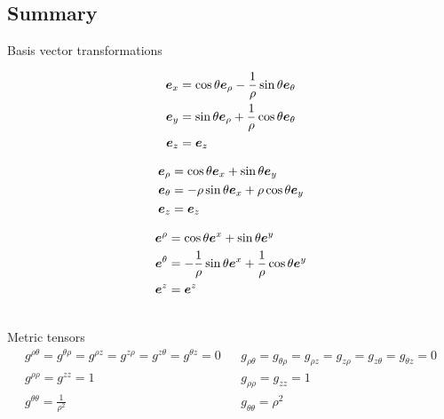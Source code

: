 \subsection{Summary}
\label{app:cylSummary}
%
Basis vector transformations\\
%
\begin{minipage}{0.3\textwidth}
\begin{align*}
    \ve{e}_x
    &=
    \cos\theta \ve{e}_\rho
    - \frac{1}{\rho} \sin\theta \ve{e}_\theta
    \\
%
%
    \ve{e}_y
    &=
    \sin\theta \ve{e}_\rho
    + \frac{1}{\rho} \cos\theta \ve{e}_\theta
    \\
%
%
    \ve{e}_z &= \ve{e}_z
\end{align*}
\end{minipage}
%
\hfill
%
\begin{minipage}{0.3\textwidth}
    \begin{align*}
        \boldsymbol{e}_\rho
        &=
        \cos\theta \boldsymbol{e}_x
        + \sin\theta \boldsymbol{e}_y
        \\
        \boldsymbol{e}_\theta
        &=
        -\rho\sin\theta \boldsymbol{e}_x
        + \rho\cos\theta \boldsymbol{e}_y
        \\
        \boldsymbol{e}_z &= \boldsymbol{e}_z
    \end{align*}
\end{minipage}
%
\hfill
%
\begin{minipage}{0.3\textwidth}
    \begin{align*}
        \boldsymbol{e}^\rho
        &=
        \cos\theta \boldsymbol{e}^x
        + \sin\theta \boldsymbol{e}^y
        \\
        \boldsymbol{e}^\theta
        &=
        -\frac{1}{\rho}\sin\theta \boldsymbol{e}^x
        + \frac{1}{\rho} \cos\theta \boldsymbol{e}^y
        \\
        \boldsymbol{e}^z &= \boldsymbol{e}^z
    \end{align*}
\end{minipage}
\\
%
Metric tensors
%
\begin{align*}
    &
    g^{\rho\theta} = g^{\theta\rho}
    = g^{\rho z} = g^{z \rho}
    = g^{z\theta} = g^{\theta z}
    = 0
    &
    &
    g_{\rho\theta} = g_{\theta\rho}
    = g_{\rho z} = g_{z \rho}
    = g_{z\theta} = g_{\theta z}
    = 0
    &
    \\
    &
    g^{\rho\rho} = g^{z z} = 1
    &
    &
    g_{\rho\rho} = g_{z z} = 1
    &
    \\
    &
    g^{\theta\theta} = \frac{1}{\rho^2}
    &
    &
    g_{\theta\theta} = \rho^2
    &
\end{align*}
